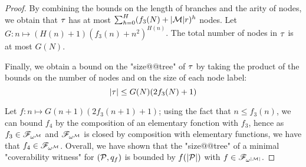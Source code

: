 \begin{proof}
	
	By combining the bounds on the length of branches and the arity of nodes, we obtain that $\tau$ has at most $\sum_{h=0}^{H} (f_3(N) + |\mathcal{M}|r)^h$ nodes. Let $G: n \mapsto (H(n)+1)(f_3(n) + n^2)^{H(n)}$. The total number of nodes in $\tau$ is at most $G(N)$.

	Finally, we obtain a bound on the "size@@tree" of $\tau$ by taking the product of the bounds on the number of nodes and on the size of each node label: 
	\[ |\tau| \leq  G(N) (2 f_3(N)+1)\]
	
	Let $f: n \mapsto  G(n+1) (2 f_3(n+1) +1)$; using the fact that $n \leq f_3(n)$, we can bound $f_4$ by the composition of an elementary fonction with $f_3$, hence as $f_3 \in \mathscr{F}_{\omega^{\mathcal{M}}}$ and $\mathscr{F}_{\omega^{\mathcal{M}}}$ is closed by composition with elementary functions, we have that $f_4 \in \mathscr{F}_{\omega^{\mathcal{M}}}$.
	Overall, we have shown that the "size@@tree" of a minimal "coverability witness" for $(\mathcal{P},q_f)$ is bounded by $f(|\mathcal{P}|)$ with $f \in \mathscr{F}_{\omega^{|\mathcal{M}|}}$.
\end{proof}

